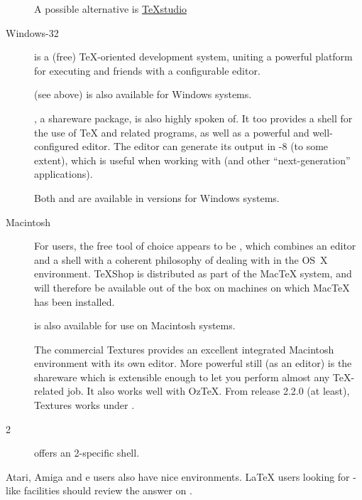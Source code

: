 \begin{description}
  A possible alternative is
  \href{http://texstudio.sourceforge.net/}{TeXstudio}
\item[Windows-32] is a (free)
  \TeX{}-oriented development system, uniting a powerful platform for
  executing \AllTeX{} and friends with a configurable editor.

  \texworks{} (see above) is also available for Windows systems.
  
  , a shareware package, is also highly spoken of.
  It too provides a shell for the use of \TeX{} and related programs,
  as well as a powerful and well-configured editor.  The editor can
  generate its output in -8 (to some extent), which is
  useful when working with  (and other
  ``next-generation'' \AllTeX{} applications).

  Both  and  are available in versions
  for Windows systems.
\item[Macintosh] For \macosx{} users, the free tool of choice appears to be
  \href{http://pages.uoregon.edu/koch/texshop/index.html}{\texshop{}}, which
  combines an editor and a shell with a coherent philosophy of dealing
  with \AllTeX{} in the OS~X environment.  TeXShop is distributed as
  part of the MacTeX system, and will therefore be available out of
  the box on machines on which MacTeX has been installed.

   is also available for use on Macintosh systems.

  The commercial Textures provides an excellent integrated Macintosh
  environment with its own editor.  More powerful still (as an editor)
  is the shareware  which is extensible enough to let
  you perform almost any \TeX{}-related job. It also works well with
  Oz\TeX{}.  From release 2.2.0 (at least), Textures works under \macosx{}.
\item[\acro{OS/}2]  offers an 2-specific shell.
\end{description}
Atari, Amiga and e users also have nice
environments. \LaTeX{} users looking for -like
facilities should review the answer on
.

